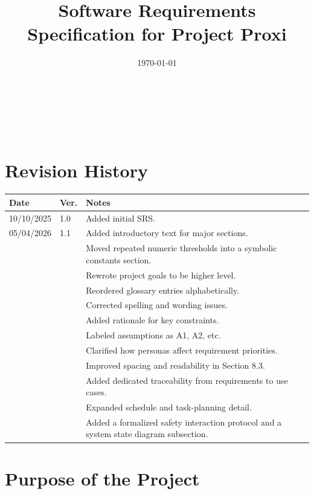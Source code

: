 \documentclass[12pt]{article}
\begin{document}
\title{
  Software Requirements Specification for Project Proxi
}
\author{\authname}
\date{\today}

\maketitle

~\newpage


\tableofcontents

~\newpage

\section*{Revision History}

\begin{tabularx}{\textwidth}{p{2.3cm}p{1.1cm}X}
\toprule
\textbf{Date} & \textbf{Ver.} & \textbf{Notes} \\
\midrule
10/10/2025 & 1.0 & Added initial SRS. \\
05/04/2026 & 1.1 & Added introductory text for major sections. \\
 &  & Moved repeated numeric thresholds into a symbolic constants section. \\
 &  & Rewrote project goals to be higher level. \\
 &  & Reordered glossary entries alphabetically. \\
 &  & Corrected spelling and wording issues. \\
 &  & Added rationale for key constraints. \\
 &  & Labeled assumptions as A1, A2, etc. \\
 &  & Clarified how personas affect requirement priorities. \\
 &  & Improved spacing and readability in Section 8.3. \\
 &  & Added dedicated traceability from requirements to use cases. \\
 &  & Expanded schedule and task-planning detail. \\
 &  & Added a formalized safety interaction protocol and a system state
 diagram subsection. \\
 
\bottomrule
\end{tabularx}

\newpage

\section{Purpose of the Project}
\end{document}
